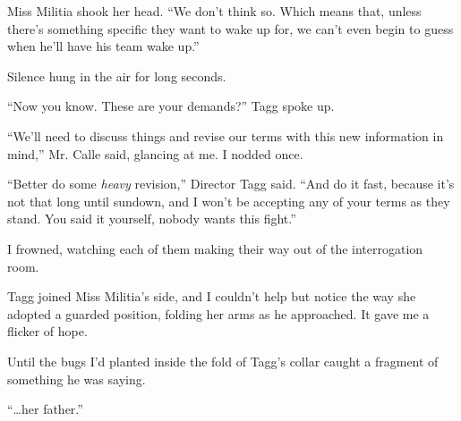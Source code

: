 Miss Militia shook her head.  ``We don't think so.  Which means that, unless there's something specific they want to wake up for, we can't even begin to guess when he'll have his team wake up.''



Silence hung in the air for long seconds.



``Now you know.  These are your demands?''  Tagg spoke up.



``We'll need to discuss things and revise our terms with this new information in mind,'' Mr. Calle said, glancing at me.  I nodded once.



``Better do some \emph{heavy} revision,'' Director Tagg said.  ``And do it fast, because it's not that long until sundown, and I won't be accepting any of your terms as they stand.  You said it yourself, nobody wants this fight.''



I frowned, watching each of them making their way out of the interrogation room.



Tagg joined Miss Militia's side, and I couldn't help but notice the way she adopted a guarded position, folding her arms as he approached.  It gave me a flicker of hope.



Until the bugs I'd planted inside the fold of Tagg's collar caught a fragment of something he was saying.



``\ldots{}her father.''






